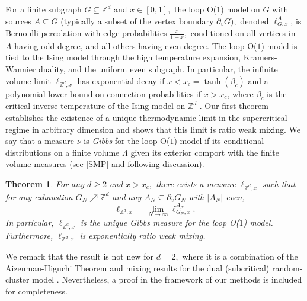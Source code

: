 \documentclass[article,11pt,reqno]{amsart}
\newcommand{\Z}{\mathbb{Z}}
\newtheorem{theorem}{Theorem}[section]
\begin{document}
For a finite subgraph $G\subseteq \mathbb{Z}^d$ and $x\in [0,1],$ the loop O($1$) model on $G$ with sources $A\subseteq G$ (typically a subset of the vertex boundary $\partial_v G),$ denoted $\ell_{G,x}^A$, is  Bernoulli percolation with edge probabilities $\frac{x}{1+x},$ conditioned on all vertices in $A$ having odd degree, and all others having even degree. The loop O($1$) model is tied to the Ising model through the high temperature expansion, Kramers-Wannier duality, and the uniform even subgraph. 
In particular, the infinite volume limit $\ell_{\mathbb{Z}^d,x}$ has exponential decay if $x < x_c = \tanh(\beta_c)$ and a polynomial lower bound on connection probabilities if $x > x_c$, where $\beta_c$ is the critical inverse temperature of the Ising model on $\Z^d$ \cite{hansen2023uniform}. 
Our first theorem establishes the existence of a unique thermodynamic limit in the supercritical regime in arbitrary dimension and shows that this limit is ratio weak mixing. We say that a measure $\nu$ is \emph{Gibbs} for the loop O($1$) model if its conditional distributions on a finite volume $\Lambda$ given its exterior comport with the finite volume measures (see \eqref{SMP} and following discussion).

\begin{theorem} \label{thm:Unique_Loop}
For any $d\geq 2$ and $x>x_c,$ there exists a measure $\ell_{\mathbb{Z}^d,x}$ such that for any exhaustion $G_N\nearrow \mathbb{Z}^d$ and any $A_N\subseteq \partial_v G_N$ with $|A_N|$ even, 
$$
\ell_{\mathbb{Z}^d,x}=\lim_{N\to\infty} \ell_{G_N,x}^{A_N}.
$$
 In particular, $\ell_{\mathbb{Z}^d,x}$ is the unique Gibbs measure for the loop O($1$) model. Furthermore, $\ell_{\mathbb{Z}^d,x}$ is exponentially ratio weak mixing.
\end{theorem}

We remark that the result is not new for $d=2,$ where it is a combination of the Aizenman-Higuchi Theorem \cite{aizenman1980translation,higuchi1981absence} and mixing results for the dual (subcritical) random-cluster model \cite{alexander1998weak,DCsharpness}. Nevertheless, a proof in the framework of our methods is included for completeness.
\end{document}
